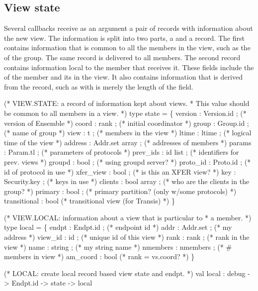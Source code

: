 %
%
%
\subsection{View state}

Several callbacks receive as an argument a pair of records with
information about the new view.  The information is split into two
parts, a  and a  record.  The
first contains information that is common to all the members in the
view, such as the  of the group.  The same record is
delivered to all members.  The second record contains information
local to the member that receives it.  These fields include the
 of the member and its  in the view.  It
also contains information that is derived from the 
record, such as  with is merely the length of the
 field.

\begin{codebox}
(* VIEW.STATE: a record of information kept about views.
 * This value should be common to all members in a view.
 *)
type state = \{
  version       : Version.id ;		(* version of Ensemble *)
  coord         : rank ;		(* initial coordinator *)
  group		: Group.id ;		(* name of group *)
  view 		: t ;			(* members in the view *)
  ltime 	: ltime ;		(* logical time of the view *)
  address       : Addr.set array ;	(* addresses of members *)
  params        : Param.tl ;		(* parameters of protocols *)
  prev_ids      : id list ;             (* identifiers for prev. views *)
  groupd        : bool ;		(* using groupd server? *)
  proto_id	: Proto.id ;		(* id of protocol in use *)
  xfer_view	: bool ;		(* is this an XFER view? *)
  key		: Security.key ;	(* keys in use *)
  clients	: bool array ;		(* who are the clients in the group? *)
  primary       : bool ;		(* primary partition? (only w/some protocols) *)
  transitional  : bool			(* transitional view (for Transis) *)
\}
\end{codebox}

\begin{codebox}
(* VIEW.LOCAL: information about a view that is particular to 
 * a member.
 *)
type local = \{
  endpt	        : Endpt.id ;		(* endpoint id *)
  addr	        : Addr.set ;		(* my address *)
  view_id 	: id ;			(* unique id of this view *)
  rank 	        : rank ;		(* rank in the view *)  
  name		: string ;		(* my string name *)
  nmembers 	: nmembers ;		(* # members in view *)
  am_coord      : bool  		(* rank = vs.coord? *)
\}  

(* LOCAL: create local record based view state and endpt.
 *)
val local : debug -> Endpt.id -> state -> local
\end{codebox}

